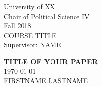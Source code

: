 


\begin{titlepage} %

        
    \begin{minipage}{0.4\textwidth} %
        \begin{flushleft} %
        \large
        University of XX\\ %
        Chair of Political Science IV\\ %
        Fall 2018\\ %
        COURSE TITLE\\ %
        Supervisor: NAME %
        \end{flushleft}
    \end{minipage}
        
    \vspace*{2in} %
        
    \center %
    
        
    {\huge\bfseries TITLE OF YOUR PAPER}\\[0.4cm] %
    {\large\today}\\[0.4cm] %
    FIRSTNAME LASTNAME %
        
    \vfill %
    
    

\end{titlepage}
